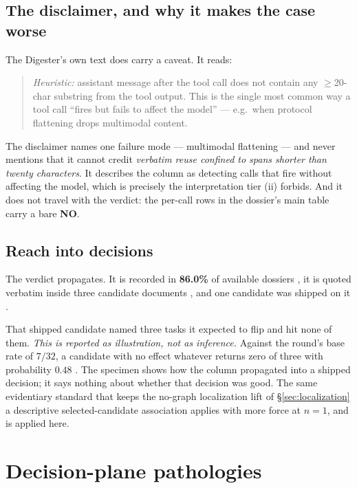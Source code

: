 \subsection*{The disclaimer, and why it makes the case worse}

The Digester's own text does carry a caveat. It reads:

\begin{quote}\small
\emph{Heuristic:} assistant message after the tool call does not contain
any $\ge$20-char substring from the tool output. This is the single most
common way a tool call ``fires but fails to affect the model'' --- e.g.\
when protocol flattening drops multimodal content.
\end{quote}

The disclaimer names one failure mode --- multimodal flattening --- and
never mentions that it cannot credit \emph{verbatim reuse confined to
spans shorter than twenty characters}. It describes the column as detecting calls that fire without
affecting the model, which is precisely the interpretation tier (ii)
forbids. And it does not travel with the verdict: the per-call rows in the
dossier's main table carry a bare \textbf{NO}.

\subsection*{Reach into decisions}

The verdict propagates. It is recorded in \textbf{86.0\%} of available dossiers , it
is quoted verbatim inside three candidate documents \F{5}, and one
candidate was shipped on it \F{6}.

That shipped candidate named three tasks it expected to flip and hit none
of them. \emph{This is reported as illustration, not as inference.} Against
the round's base rate of $7/32$, a candidate with no effect whatever
returns zero of three with probability $0.48$ \F{6}. The specimen shows how the
column propagated into a shipped decision; it says nothing about
whether that decision was good. The same evidentiary standard that keeps the
no-graph localization lift of \S\ref{sec:localization} a descriptive
selected-candidate association applies with more force at $n{=}1$, and is
applied here.

\section{Decision-plane pathologies}
\label{sec:decision}

